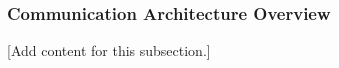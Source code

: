 
\subsubsection{Communication Architecture Overview}
\label{subsubsec:design_2_3_1_communication_architecture_overview}

[Add content for this subsection.]
